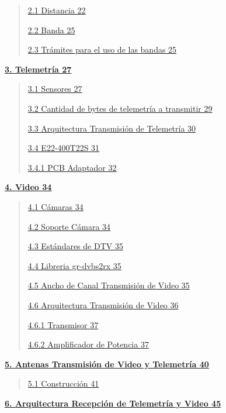 \documentclass[12pt,a4paper]{article}
\begin{document}
\begin{quote}
\hyperref[distancia]{2.1 Distancia 22}

\hyperref[banda]{2.2 Banda 25}

\hyperref[truxe1mites-para-el-uso-de-las-bandas]{2.3 Trámites para el uso de las bandas 25}
\end{quote}

\hyperref[telemetruxeda]{\textbf{3. Telemetría 27}}

\begin{quote}
\hyperref[sensores]{3.1 Sensores 27}

\hyperref[cantidad-de-bytes-de-telemetruxeda-a-transmitir]{3.2 Cantidad de bytes de telemetría a transmitir 29}

\hyperref[arquitectura-transmisiuxf3n-de-telemetruxeda]{3.3 Arquitectura Transmisión de Telemetría 30}

\hyperref[e22-400t22s]{3.4 E22-400T22S 31}

\hyperref[pcb-adaptador]{3.4.1 PCB Adaptador 32}
\end{quote}

\hyperref[video]{\textbf{4. Video 34}}

\begin{quote}
\hyperref[cuxe1maras]{4.1 Cámaras 34}

\hyperref[soporte-cuxe1mara]{4.2 Soporte Cámara 34}

\hyperref[estuxe1ndares-de-dtv]{4.3 Estándares de DTV 35}

\hyperref[libreria-gr-dvbs2rx]{4.4 Libreria gr-dvbs2rx 35}

\hyperref[ancho-de-canal-transmisiuxf3n-de-video]{4.5 Ancho de Canal Transmisión de Video 35}

\hyperref[arquitectura-transmisiuxf3n-de-video]{4.6 Arquitectura Transmisión de Video 36}

\hyperref[transmisor]{4.6.1 Transmisor 37}

\hyperref[amplificador-de-potencia-1]{4.6.2 Amplificador de Potencia 37}
\end{quote}

\hyperref[antenas-transmisiuxf3n-de-video-y-telemetruxeda]{\textbf{5. Antenas Transmisión de Video y Telemetría 40}}

\begin{quote}
\hyperref[construcciuxf3n]{5.1 Construcción 41}
\end{quote}

\hyperref[arquitectura-recepciuxf3n-de-telemetruxeda-y-video]{\textbf{6. Arquitectura Recepción de Telemetría y Video 45}}
\end{document}
